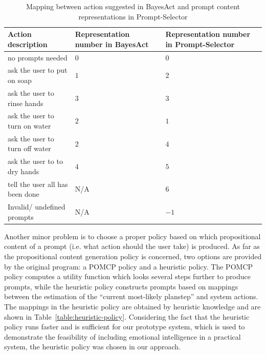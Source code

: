 %
\begin{table}
\centering
\caption{Mapping between action suggested in BayesAct and prompt content representations in Prompt-Selector}
\label{table:prompt-number-def}
\begin{tabular}{| l | p{5cm} | p{5cm} |}
\hline
Action description & Representation number in BayesAct & Representation number in Prompt-Selector \\ \hline
no prompts needed & 0 & 0\\ \hline
ask the user to put on soap & $1$ & $2$ \\ \hline
ask the user to rinse hands & $3$ & $3$ \\ \hline
ask the user to turn on water & $2$ & $1$ \\ \hline
ask the user to turn off water & $2$ & $4$ \\ \hline
ask the user to to dry hands & $4$ & $5$ \\ \hline
tell the user all has been done & N/A & $6$ \\ \hline
Invalid/ undefined prompts & N/A &$-1$ \\ \hline
\end{tabular}
\end{table}

Another minor problem is to choose a proper policy based on which propositional content of a prompt (i.e. what action should the user take) is produced. As far as the propositional content generation policy is concerned, two options are provided by the original program: a POMCP policy and a heuristic policy. The POMCP policy computes a utility function which looks several steps further to produce prompts, while the heuristic policy constructs prompts based on mappings between the estimation of the ``current most-likely  planstep'' and system actions. The mappings in the heuristic policy are obtained by heuristic knowledge and are shown in Table~\ref{table:heuristic-policy}. Considering the fact that the heuristic policy runs faster and is sufficient for our prototype system, which is used to demonstrate the feasibility of including emotional intelligence in a practical system, the heuristic policy was chosen in our approach.

